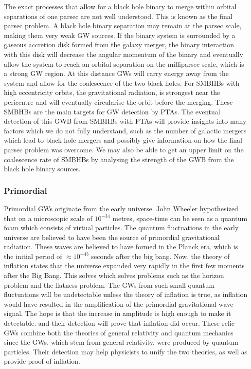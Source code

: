 \documentclass[12pt]{article}
\begin{document}
\noindent The exact processes that allow for a black hole binary to merge within orbital separations of one parsec are not well understood. This is known as the final parsec problem. A black hole binary separation may remain at the parsec scale, making them very weak GW sources. If the binary system is surrounded by a gaseous accretion disk formed from the galaxy merger, the binary interaction with this disk will decrease the angular momentum of the binary and eventually allow the system to reach an orbital separation on the milliparsec scale, which is a strong GW region. At this distance GWs will carry energy away from the system and allow for the coalescence of the two black holes. For SMBHBs with high eccentricity orbits, the gravitational radiation, is strongest near the pericentre and will eventually circularise the orbit before the merging. These SMBHBs are the main targets for GW detection by PTAs. The eventual detection of this GWB from SMBHBs with PTAs will provide insights into many factors which we do not fully understand, such as the number of galactic mergers which lead to black hole mergers and possibly give information on how the final parsec problem was overcome. We may also be able to get an upper limit on the coalescence rate of SMBHBs by analysing the strength of the GWB from the black hole binary sources.\\

\subsubsection{Primordial}\label{prim GW}

\noindent Primordial GWs originate from the early universe. John Wheeler hypothesized that on a microscopic scale of $10^{-34}$ metres, space-time can be seen as a quantum foam which consists of virtual particles. The quantum fluctuations in the early universe are believed to have been the source of primordial gravitational radiation. These waves are believed to have formed in the Planck era, which is the initial period of $\approx 10^{-43}$ seconds after the big bang. Now, the theory of inflation states that the universe expanded very rapidly in the first few moments after the Big Bang. This solves which solves problems such as the horizon problem and the flatness problem. The GWs from such small quantum fluctuations will be undetectable unless the theory of inflation is true, as inflation would have resulted in the amplification of the primordial gravitational wave signal. The hope is that the increase in amplitude is high enough to make it detectable. and their detection will prove that inflation did occur. These relic GWs combine both the theories of general relativity and quantum mechanics since the GWs, which stem from general relativity, were produced by quantum particles. Their detection may help physicists to unify the two theories, as well as provide proof of inflation. 
 
\end{document}

